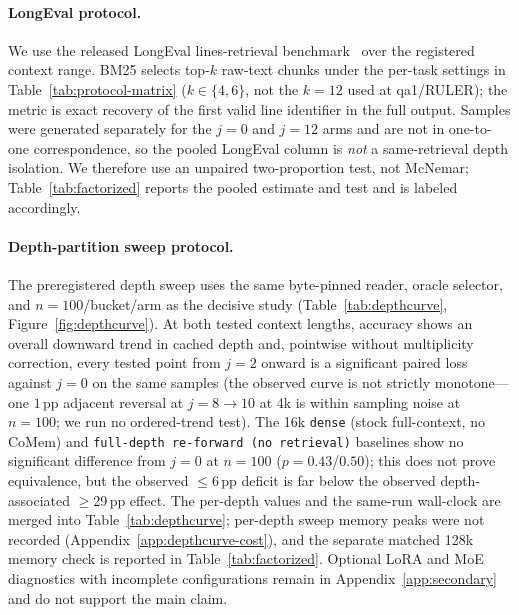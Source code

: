 \paragraph{LongEval protocol.}
We use the released LongEval lines-retrieval benchmark~\citep{longeval} over the
registered context range.  BM25 selects top-$k$ raw-text chunks under the
per-task settings in Table~\ref{tab:protocol-matrix} ($k\in\{4,6\}$,
not the $k{=}12$ used at qa1/RULER); the metric is exact recovery of the
first valid line identifier in the full output.  Samples were generated
separately for the $j=0$ and $j=12$ arms and are not in one-to-one
correspondence, so the pooled LongEval column is \emph{not} a same-retrieval
depth isolation.  We therefore use an unpaired two-proportion test, not
McNemar; Table~\ref{tab:factorized} reports the pooled estimate and test and
is labeled accordingly.

\paragraph{Depth-partition sweep protocol.}
The preregistered depth sweep uses the same byte-pinned reader, oracle
selector, and $n{=}100$/bucket/arm as the decisive study
(Table~\ref{tab:depthcurve}, Figure~\ref{fig:depthcurve}).  At both tested
context lengths, accuracy shows an overall downward trend in cached depth and,
pointwise without multiplicity correction, every tested point from $j{=}2$
onward is a significant paired loss against $j{=}0$ on the same samples
(the observed curve is not strictly monotone---one $1$\,pp adjacent reversal at
$j{=}8\!\to\!10$ at 4k is within sampling noise at $n{=}100$; we run no ordered-trend
test).  The 16k \texttt{dense} (stock full-context, no CoMem) and
\texttt{full-depth re-forward (no retrieval)} baselines show no
significant difference from $j{=}0$ at $n{=}100$ ($p{=}0.43$/$0.50$); this does
not prove equivalence, but the observed $\le$6\,pp deficit is far below the
observed depth-associated $\ge$29\,pp effect.  The per-depth values and the
same-run wall-clock are merged into Table~\ref{tab:depthcurve}; per-depth sweep
memory peaks were not recorded (Appendix~\ref{app:depthcurve-cost}), and the
separate matched 128k memory check is reported in Table~\ref{tab:factorized}.
Optional LoRA and MoE diagnostics with incomplete configurations remain in
Appendix~\ref{app:secondary} and do not support the main claim.

